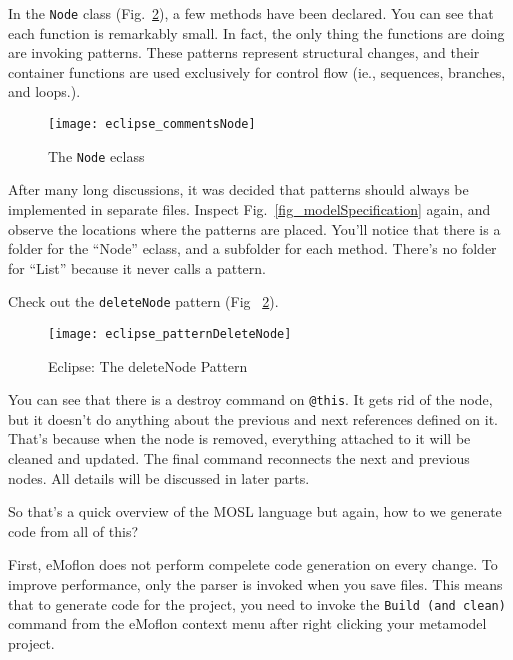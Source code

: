 In the \texttt{Node} class (Fig.~\ref{fig_patternDeleteNode}), a few methods have been declared. You can see that each
function is remarkably small. In fact, the only thing the functions are doing are invoking patterns. These patterns represent structural changes, and their
container functions are used exclusively for control flow (ie., sequences, branches, and loops.).

 \begin{figure}[htbp]
  \centering
  \texttt{[image: eclipse\_commentsNode]}
  \caption{The \texttt{Node} eclass}
  \label{fig_eclassNode}
\end{figure}


After many long discussions, it was decided that patterns should always be implemented in separate files. Inspect Fig.~\ref{fig_modelSpecification} again, and
observe the locations where the patterns are placed. You'll notice that there is a folder for the ``Node'' eclass, and a subfolder for each method. There's no
folder for ``List'' because it never calls a pattern.

Check out the \texttt{deleteNode} pattern (Fig ~\ref{fig_patternDeleteNode}).

 \begin{figure}[htbp]
  \centering
  \texttt{[image: eclipse\_patternDeleteNode]}
  \caption{Eclipse: The deleteNode Pattern}
  \label{fig_patternDeleteNode}
\end{figure}

You can see that there is a destroy command on \texttt{@this}. It gets rid of the node, but it doesn't do anything about the previous and next references
defined on it. That's because when the node is removed, everything attached to it will be cleaned and updated. The final command reconnects the next and
previous nodes. All details will be discussed in later parts.
 
So that's a quick overview of the MOSL language but again, how to we generate code from all of this?


First, eMoflon does not perform compelete code generation on every change. To improve performance, only the parser is invoked when you save files. This means
that to generate code for the project, you need to invoke the \texttt{Build (and clean)} command from the eMoflon context menu after right clicking your
metamodel project.
